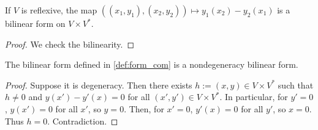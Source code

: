 \begin{definition}
    \label{def:form_com}
    \uses{}
    \leanok 

    If $V$ is reflexive, the map $((x_1,y_1),(x_2,y_2))\mapsto y_1(x_2)-y_2(x_1)$ is a bilinear form on 
    $V\times V^*$.
    \begin{proof}
        \leanok
        We check the bilinearity.
    \end{proof}
\end{definition}

\begin{proposition}[Nondegeneracy]
    \label{def:non_dege_form_com}
    \leanok 

    The bilinear form defined in \ref{def:form_com} is a nondegeneracy bilinear form.
\end{proposition}
\begin{proof}
    \leanok
    Suppose it is degeneracy. Then there exists $h:=(x,y)\in V\times V^*$ such that
    $h\ne 0$ and $y(x')-y'(x)=0$ for all $(x',y')\in V\times V^*$.
    In particular, for $y'=0$, $y(x')=0$ for all $x'$, so $y=0$.
    Then, for $x'=0$, $y'(x)=0$ for all $y'$, so $x=0$.
    Thus $h=0$. Contradiction.
\end{proof}